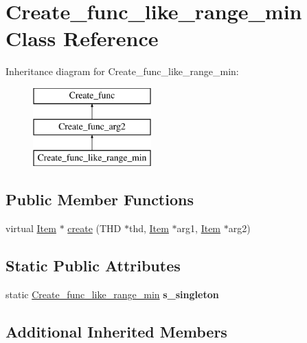 \hypertarget{classCreate__func__like__range__min}{}\section{Create\+\_\+func\+\_\+like\+\_\+range\+\_\+min Class Reference}
\label{classCreate__func__like__range__min}
Inheritance diagram for Create\+\_\+func\+\_\+like\+\_\+range\+\_\+min\+:\begin{figure}[H]
\begin{center}
\leavevmode
\includegraphics[height=3.000000cm]{classCreate__func__like__range__min}
\end{center}
\end{figure}
\subsection*{Public Member Functions}
\begin{DoxyCompactItemize}
\item 
virtual \mbox{\hyperlink{classItem}{Item}} $\ast$ \mbox{\hyperlink{classCreate__func__like__range__min_a5b40cd399502e4a0a951373b387f38a8}{create}} (T\+HD $\ast$thd, \mbox{\hyperlink{classItem}{Item}} $\ast$arg1, \mbox{\hyperlink{classItem}{Item}} $\ast$arg2)
\end{DoxyCompactItemize}
\subsection*{Static Public Attributes}
\begin{DoxyCompactItemize}
\item 
\mbox{\label{classCreate__func__like__range__min_a943220e87c3133b4b16ce3cb388b9469}} 
static \mbox{\hyperlink{classCreate__func__like__range__min}{Create\+\_\+func\+\_\+like\+\_\+range\+\_\+min}} {\bfseries s\+\_\+singleton}
\end{DoxyCompactItemize}
\subsection*{Additional Inherited Members}


